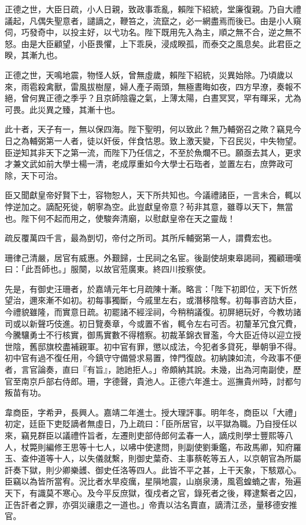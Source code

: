 \begin{pinyinscope}
正德之世，大臣日疏，小人日親，致政事乖亂，賴陛下紹統，堂廉復親。乃自大禮議起，凡偶失聖意者，譴謫之，鞭笞之，流竄之，必一網盡焉而後已。由是小人窺伺，巧發奇中，以投主好，以弋功名。陛下既用先入為主，順之無不合，逆之無不怒。由是大臣顧望，小臣畏懼，上下乖戾，浸成睽孤，而泰交之風息矣。此君臣之睽，其漸九也。

正德之世，天鳴地震，物怪人妖，曾無虛歲，賴陛下紹統，災異始除。乃頃歲以來，雨雹殺禽獸，雷風拔樹屋，婦人產子兩頭，無極晝晦如夜，四方早潦，奏報不絕，曾何異正德之季乎？且京師陰霾之氣，上薄太陽，白晝冥冥，罕有暉采，尤為可畏。此災異之臻，其漸十也。

此十者，天子有一，無以保四海。陛下聖明，何以致此？無乃輔弼召之歟？竊見今日之為輔弼第一人者，徒以奸佞，伴食怙恩。致上激天變，下召民災，中失物望。臣逆知其非天下之第一流，而陛下乃任信之，不至於魚爛不已。願亟去其人，更求才兼文武如前大學士楊一清，老成厚重如今大學士石珤者，並置左右，庶弊政可除，天下可治。

臣又聞獻皇帝好賢下士，容物恕人，天下所共知也。今議禮諸臣，一言未合，輒以悖逆加之。謫配死徙，朝寧為空。此豈獻皇帝意？茍非其意，雖尊以天下，無當也。陛下何不起而用之，使駿奔清廟，以慰獻皇帝在天之靈哉！

疏反覆萬四千言，最為剴切，帝付之所司。其所斥輔弼第一人，謂費宏也。

珊律己清嚴，居官有威惠。外艱歸，士民祠之名宦。後副使胡東皋謁祠，獨顧珊嘆曰：「此吾師也。」服闋，以故官蒞廣東。終四川按察使。

先是，有御史汪珊者，於嘉靖元年七月疏陳十漸。略言：「陛下初即位，天下忻然望治，邇來漸不如初。初每事獨斷，今戚里左右，或潛移陰奪。初每事咨訪大臣，今禮貌雖隆，而實意日疏。初罷諸不經淫祠，今稍稍議復。初屏絕玩好，今教坊諸司或以新聲巧伎進。初日覽奏章，今或置不省，輒令左右可否。初釐革冗食冗費，今騰驤勇士不行核實，御馬實數不得稽察。初裁革錦衣冒濫，今大臣近侍以迎立授世陰，舊邸旗校盡補親軍。初中官有罪，懲以成法，今犯者多貸死，舉朝爭不得。初中官有過不復任用，今鎮守守備營求易置，悻門復啟。初納諫如流，今政事不便者，言官論奏，直曰『有旨』，訑訑拒人。」帝頗納其說。未幾，出為河南副使，歷官至南京戶部右侍郎。珊，字德聲，貴池人。正德六年進士。巡撫貴州時，討都勻叛苗有功。

韋商臣，字希尹，長興人。嘉靖二年進士。授大理評事。明年冬，商臣以「大禮」初定，廷臣下吏貶謫者無虛日，乃上疏曰：「臣所居官，以平獄為職。乃自授任以來，竊見群臣以議禮忤旨者，左遷則吏部侍郎何孟春一人，謫戍則學士豐熙等八人，杖斃則編修王思等十七人，以咈中使逮問，則副使劉秉鑑，布政馬卿，知府羅玉、查仲道等十人，以失儀就繫，則御史葉奇、主事蔡乾等五人，以京朝官為所屬訐奏下獄，則少卿樂頀、御史任洛等四人。此皆不平之甚，上干天象，下駭眾心。臣竊以為皆所當宥。況比者水旱疫癘，星隕地震，山崩泉湧，風雹蝗蝻之害，殆遍天下，有識莫不寒心。及今平反庶獄，復戍者之官，錄死者之後，釋逮繫者之囚，正告訐者之罪，亦弭災禳患之一道也。」帝責以沽名賣直，謫清江丞，量移德安推官。


\end{pinyinscope}
